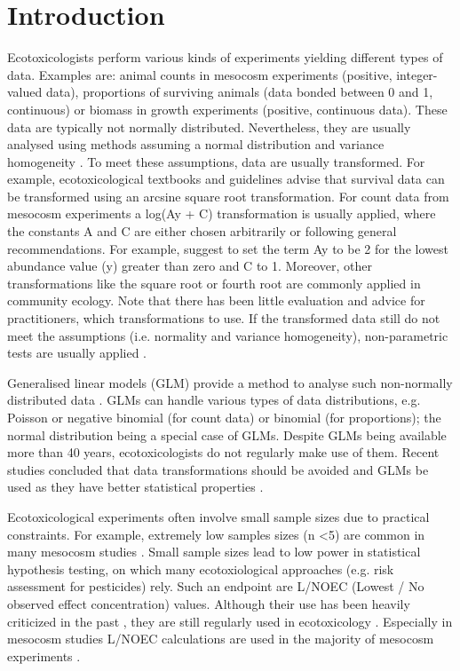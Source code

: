 \documentclass{scrartcl}
\begin{document}
\section{Introduction}
\label{sec:intro}
Ecotoxicologists perform various kinds of experiments yielding different types of data.
Examples are: animal counts in mesocosm experiments (positive, integer-valued data), proportions of surviving animals (data bonded between 0 and 1, continuous) or biomass in growth experiments (positive, continuous data).
These data are typically not normally distributed. 
Nevertheless, they are usually analysed using methods assuming a normal distribution and variance homogeneity \citep{wang_making_2011}. 
To meet these assumptions, data are usually transformed.
For example, ecotoxicological textbooks \citep{newman_quantitative_2012} and guidelines \citep{epa_methods_2002,oecd_current_2006} advise that survival data can be transformed using an arcsine square root transformation. 
For count data from mesocosm experiments a log(Ay + C) transformation is usually applied, where the constants A and C are either chosen arbitrarily or following general recommendations. 
For example, \citet{van_den_brink_impact_2000} suggest to set the term Ay to be 2 for the lowest abundance value (y) greater than zero and C to 1. 
Moreover, other transformations like the square root or fourth root are commonly applied in community ecology.
Note that there has been little evaluation and advice for practitioners, which transformations to use.
If the transformed data still do not meet the assumptions (i.e. normality and variance homogeneity), non-parametric tests are usually applied \citep{wang_making_2011}.

Generalised linear models (GLM) provide a method to analyse such non-normally distributed data \citep{nelder_generalized_1972}.
GLMs can handle various types of data distributions, e.g. Poisson or negative binomial (for count data) or binomial (for proportions); the normal distribution being a special case of GLMs.
Despite GLMs being available more than 40 years, ecotoxicologists do not regularly make use of them.
Recent studies concluded that data transformations should be avoided and GLMs be used as they have better statistical properties \citep{ohara_not_2010, warton_arcsine_2011}. 

Ecotoxicological experiments often involve small sample sizes due to practical constraints. 
For example, extremely low samples sizes (n \textless 5) are common in many mesocosm studies \citep{sanderson_pesticide_2002,szocs_analysing_2015}.
Small sample sizes lead to low power in statistical hypothesis testing, on which many ecotoxiological approaches (e.g. risk assessment for pesticides) rely. 
Such an endpoint are L/NOEC (Lowest / No observed effect concentration) values.
Although their use has been heavily criticized in the past \citep{laskowski_good_1995},  they are still regularly used in ecotoxicology \citep{jager_bad_2012}.
Especially in mesocosm studies L/NOEC calculations are used in the majority of mesocosm experiments \citep{brock_minimum_2015, efsa_ppr_guidance_2013}. 
\end{document}

